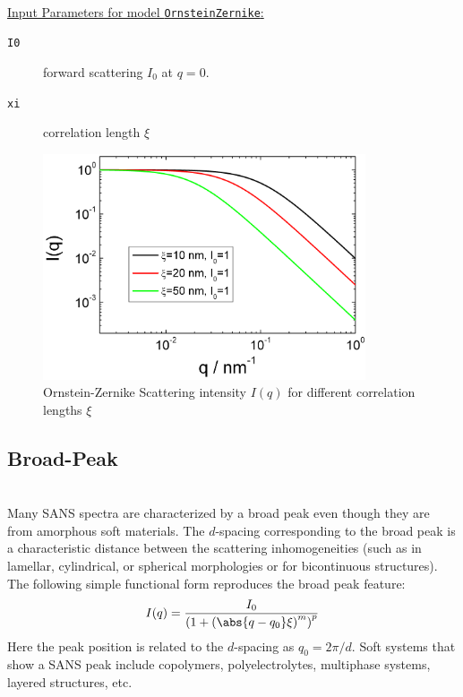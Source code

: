 \hspace{1pt}\\
\underline{Input Parameters for model \texttt{OrnsteinZernike}:}\\
\begin{description}
\item[\texttt{I0}] forward scattering $I_0$ at $q=0$.
\item[\texttt{xi}] correlation length $\xi$
\end{description}

\begin{figure}[htb]
\begin{center}
\includegraphics[width=0.85\textwidth]{OrnsteinZernicke.png}
\end{center}
\caption{Ornstein-Zernike Scattering intensity $I(q)$ for different
correlation lengths $\xi$} \label{fig:OrnsteinZernicke}
\end{figure}
\clearpage

\subsection{Broad-Peak}
\label{sect:BroadPeak}
 ~\\
Many SANS spectra are characterized by a broad peak even though they
are from amorphous soft materials. The $d$-spacing corresponding to
the broad peak is a characteristic distance between the scattering
inhomogeneities (such as in lamellar, cylindrical, or spherical
morphologies or for bicontinuous structures). The following simple
functional form reproduces the broad peak feature:
\begin{align}
I(q) = \frac{I_0}{\left(1+\left(\abs{q-q_0}\xi\right)^m\right)^p}
\end{align}
Here the peak position is related to the $d$-spacing as $q_0 =
2\pi/d$. Soft systems that show a SANS peak include copolymers,
polyelectrolytes, multiphase systems, layered structures, etc.

